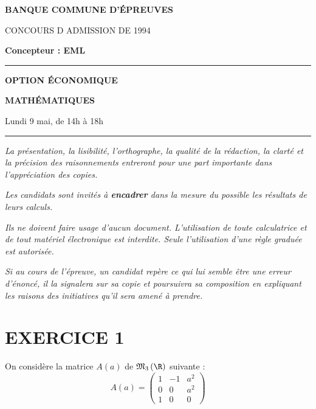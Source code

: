 \documentclass[11pt]{article}%
\begin{document}

\begin{center}
{\LARG\E\textbf{BANQUE COMMUNE D'ÉPREUVES}}



{\large \textsc{CONCOURS D ADMISSION DE 1994}}



{\large \textbf{Concepteur : EML}}



\rule{2.39cm}{0.05cm}



{\Large \textbf{OPTION ÉCONOMIQUE}}



{\Large \textbf{MATHÉMATIQUES }}



{\Large Lundi 9 mai, de 14h à 18h}



\rule{2.39cm}{0.05cm}
\end{center}

\textit{La présentation, la lisibilité, l'orthographe, la qualité
de la rédaction, la clarté et la précision des raisonnements
entreront pour une part importante dans l'appréciation des copies.}

\textit{Les candidats sont invités à \textbf{encadrer} dans la mesure
du possible les résultats de leurs calculs.}

\textit{Ils ne doivent faire usage d'aucun document. L'utilisation de
toute
calculatrice et de tout matériel électronique est interdite. Seule
l'utilisation d'une règle graduée est autorisée.}

\textit{Si au cours de l'épreuve, un candidat repère ce qui lui semble
être une erreur d'énoncé, il la signalera sur sa copie et
poursuivra sa composition en expliquant les raisons des initiatives
qu'il sera
amené à prendre.}

\vspace*{3cm}

\section*{EXERCICE 1}

On considère la matrice $A\left( a\right) $ de $\mathfrak{M}_{3}\left( 
\R\right) $ suivante : 
\[
A\left( a\right) = \left( 
\begin{array}{ccc}
1 & -1 & a^{2} \\
0 & 0 & a^{2} \\
1 & 0 & 0
\end{array}
\right)
\]
\end{document}
